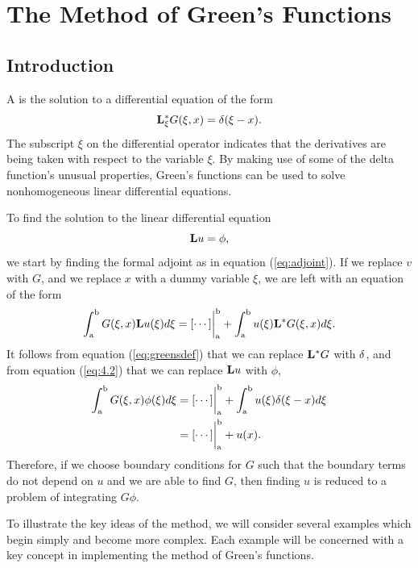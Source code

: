\section{The Method of Green's Functions}
\setcounter{example}{0}
\subsection{Introduction}
A  is the solution to a differential equation of the form
\begin{equation} \label{eq:greensdef}
    \mathrm{\bf{L^*_\xi}} G(\xi, x) = \delta(\xi - x). 
\end{equation}
The subscript \(\xi\) on the differential operator indicates that the derivatives are being taken with respect to the variable \(\xi\). By making use of some of the delta function's unusual properties, Green's functions can be used to solve nonhomogeneous linear differential equations.

To find the solution to the linear differential equation
\begin{equation} \label{eq:4.2}
    \mathrm{\bf{L}}u=\phi,
\end{equation}
we start by finding the formal adjoint as in equation (\ref{eq:adjoint}). If we replace \(v\) with \(G\), and we replace \(x\) with a dummy variable \(\xi\), we are left with an equation of the form
\begin{equation} \label{eq:greenadjoint}
    \int_\mathrm{a}^\mathrm{b} G(\xi, x)\mathrm{\bf{L}}u(\xi) d\xi = [\cdots]\biggr\rvert_\mathrm{a}^\mathrm{b} + \int_\mathrm{a}^\mathrm{b} u(\xi)\mathrm{\bf{L^*}}G(\xi,x) d\xi.
\end{equation} 
It follows from equation (\ref{eq:greensdef}) that we can replace \(\mathrm{\bf{L^*}}G\) with \(\delta\), and from equation (\ref{eq:4.2}) that we can replace \(\mathrm{\bf{L}}u\) with \(\phi\), 
\begin{equation}
    \begin{split}
        \int_\mathrm{a}^\mathrm{b} G(\xi,x)\phi(\xi) d\xi &= [\cdots]\biggr\rvert_\mathrm{a}^\mathrm{b} + \int_\mathrm{a}^\mathrm{b} u(\xi)\delta(\xi-x) d\xi\\
        &=[\cdots]\biggr\rvert_\mathrm{a}^\mathrm{b} + u(x).
    \end{split}
\end{equation}
Therefore, if we choose boundary conditions for \(G\) such that the boundary terms do not depend on \(u\) and we are able to find \(G\), then finding \(u\) is reduced to a problem of integrating \(G\phi\). 

To illustrate the key ideas of the method, we will consider several examples which begin simply and become more complex. Each example will be concerned with a key concept in implementing the method of Green's functions.

